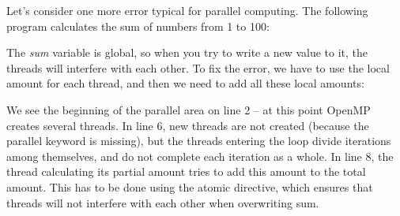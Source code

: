 {	\par Let's consider one more error typical for parallel computing. The following program calculates the sum of numbers from 1 to 100:
	\begin{figure}[H]
		
	\end{figure}
	\par The \textit{sum} variable is global, so when you try to write a new value to it, the threads will interfere with each other. To fix the error, we have to use the local amount for each thread, and then we need to add all these local amounts:
	\begin{figure}[H]
		
	\end{figure}
	We see the beginning of the parallel area on line 2 – at this point OpenMP creates several threads. In line 6, new threads are not created (because the parallel keyword is missing), but the threads entering the loop divide iterations among themselves, and do not complete each iteration as a whole. In line 8, the  thread calculating its partial amount tries to add this amount to the total amount. This has to be done using the atomic directive, which ensures that threads will not interfere with each other when overwriting sum.
	
}
